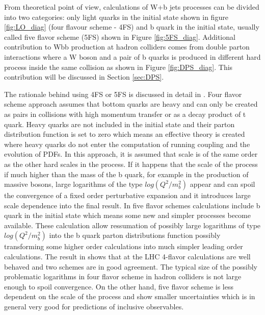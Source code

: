 From theoretical point of view, calculations of W+b jets processes can be divided into two categories: only light quarks in the initial state shown in figure \ref{fig:LO_diag} (four flavour scheme - 4FS) and b quark in the initial state, usually called five flavor scheme (5FS) shown in Figure \ref{fig:5FS_diag}. Additional contribution to Wbb production at hadron colliders comes from double parton interactions where a W boson and a pair of b quarks is produced in different hard process inside the same collision as shown in Figure \ref{fig:DPS_diag}. This contribution will be discussed in Section \ref{sec:DPS}.

\par The rationale behind using 4FS or 5FS is discussed in detail in \cite{Maltoni:2012pa}. Four flavor scheme approach assumes that bottom quarks are heavy and can only be created as pairs in collisions with high momentum transfer or as a decay product of t quark. Heavy quarks are not included in the initial state and their parton distribution function is set to zero which means an effective theory is created where heavy quarks do not enter the computation of running coupling and the evolution of PDFs. In this approach, it is assumed that scale is of the same order as the other hard scales in the process. If it happens that the scale of the process if much higher than the mass of the b quark, for example in the production of massive bosons, large logarithms of the type $log(Q^2/m_b^2)$ appear and can spoil the convergence of a fixed order perturbative expansion and it introduces large scale dependence into the final result. In five flavor schemes calculations include b quark in the initial state which means some new and simpler processes become available. These calculation allow ressumation of possibly large logarithms of type $log(Q^2/m_b^2)$ into the b quark parton distributions function possibly transforming some higher order calculations into much simpler leading order calculations.  
The result in \cite{Maltoni:2012pa} shows that at the LHC 4-flavor calculations are well behaved and two schemes are in good agreement. The typical size of the possibly problematic logarithms in four flavor scheme in hadron colliders is not large enough to spoil convergence. On the other hand, five flavor scheme is less dependent on the scale of the process and show smaller uncertainties which is in general very good for predictions of inclusive observables.  

